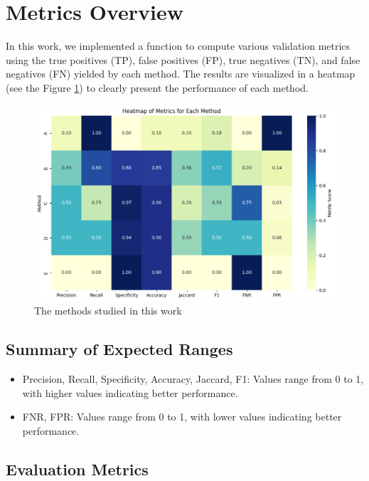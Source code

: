 \documentclass{llncs}
\begin{document}
\section{Metrics Overview}

In this work, we implemented a function to compute various validation metrics using the true positives (TP), false positives (FP), true negatives (TN), and false negatives (FN) yielded by each method. The results are visualized in a heatmap  (see the Figure \ref{fig:heatmap}) to clearly present the performance of each method.

\begin{figure}[h!]
	\begin{center}  %
		\includegraphics[width=1\textwidth]{images/heat_map.png}
		\caption{The methods studied in this work}
		\label{fig:heatmap}
	\end{center}
\end{figure}

\subsection{Summary of Expected Ranges}
\begin{itemize}
	\item Precision, Recall, Specificity, Accuracy, Jaccard, F1: Values range from 0 to 1, with higher values indicating better performance.
	\item FNR, FPR: Values range from 0 to 1, with lower values indicating better performance.
\end{itemize}


\subsection{Evaluation Metrics}
\end{document}
